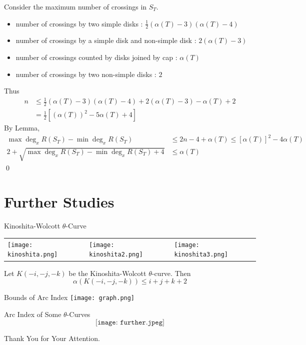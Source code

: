 \begin{frame}
	Consider the maximum number of crossings in $S_T$.

	\begin{itemize}
		\item number of crossings by two simple disks : $\frac12\left(\alpha(T)-3\right)\left(\alpha(T)-4\right)$
		\item number of crossings by a simple disk and non-simple disk : $2\left(\alpha(T)-3\right)$
		\item number of crossings counted by disks joined by cap : $\alpha(T)$
		\item number of crossings by two non-simple disks : $2$
	\end{itemize}

	Thus
	\begin{align*}
		n & \le \frac12\left(\alpha(T)-3\right)\left(\alpha(T)-4\right) + 2\left(\alpha(T)-3\right) -\alpha(T) + 2\\
		& = \frac12\left[(\alpha(T))^2 - 5\alpha(T) + 4\right]
	\end{align*}
	By Lemma,
	\begin{align*}
		\max\deg_xR(S_T) - \min\deg_xR(S_T) & \le 2n - 4 + \alpha(T) \le \left[\alpha(T)\right]^2 - 4\alpha(T)\\
		2 + \sqrt{\max\deg_xR(S_T) - \min\deg_xR(S_T) + 4} & \le \alpha(T)
	\end{align*}
	\hfill\qed
\end{frame}


\section{Further Studies}

\begin{frame}{Kinoshita-Wolcott $\theta$-Curve}
	\begin{tabu}{XXX}
		\texttt{[image: kinoshita.png]} & \texttt{[image: kinoshita2.png]} & \texttt{[image: kinoshita3.png]}
	\end{tabu}

	\begin{thm}
	Let $K(-i,-j,-k)$ be the Kinoshita-Wolcott $\theta$-curve.
	Then
	\[
		\alpha(K(-i,-j,-k)) \le i + j + k + 2
	\]
	\end{thm}
\end{frame}


\begin{frame}{Bounds of Arc Index}
	\texttt{[image: graph.png]}
\end{frame}

\begin{frame}{Arc Index of Some $\theta$-Curves}
	$$\texttt{[image: further.jpeg]}$$
\end{frame}


\begin{frame}
	\begin{center}
		\huge Thank You for Your Attention.
	\end{center}
\end{frame}

